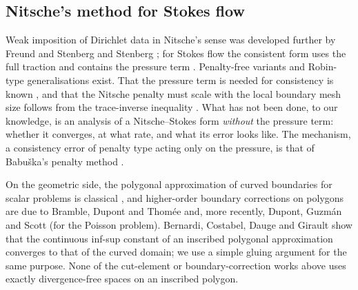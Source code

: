 \documentclass[pdflatex,sn-mathphys-num]{sn-jnl}
\theoremstyle{thmstyleone}
\theoremstyle{thmstylethree}
\begin{document}
\subsection{Nitsche's method for Stokes flow}
Weak imposition of Dirichlet data in Nitsche's sense was developed further by Freund and Stenberg \cite{FreundStenberg1995} and Stenberg \cite{Stenberg1995}; for Stokes flow the consistent form uses the full traction and contains the pressure term \cite{FreundStenberg1995,Stenberg1995,Becker2002,BurmanHansbo2014}. Penalty-free variants \cite{Burman2012,BoiveauBurman2016} and Robin-type generalisations \cite{JuntunenStenberg2009} exist. That the pressure term is needed for consistency is known \cite{BurmanHansboLarson2019Stokes}, and that the Nitsche penalty must scale with the local boundary mesh size follows from the trace-inverse inequality \cite{Stenberg1995,JuntunenStenberg2009}. What has not been done, to our knowledge, is an analysis of a Nitsche--Stokes form \emph{without} the pressure term: whether it converges, at what rate, and what its error looks like. The mechanism, a consistency error of penalty type acting only on the pressure, is that of Babu\v{s}ka's penalty method \cite{Babuska1973}.

On the geometric side, the polygonal approximation of curved boundaries for scalar problems is classical \cite{BergerScottStrang1972,Scott1975}, and higher-order boundary corrections on polygons are due to Bramble, Dupont and Thom\'ee \cite{BrambleDupontThomee1972} and, more recently, Dupont, Guzm\'an and Scott \cite{DupontGuzmanScott2025} (for the Poisson problem). Bernardi, Costabel, Dauge and Girault \cite{BCDG2016} show that the continuous inf-sup constant of an inscribed polygonal approximation converges to that of the curved domain; we use a simple gluing argument for the same purpose. None of the cut-element or boundary-correction works above uses exactly divergence-free spaces on an inscribed polygon.
\end{document}

